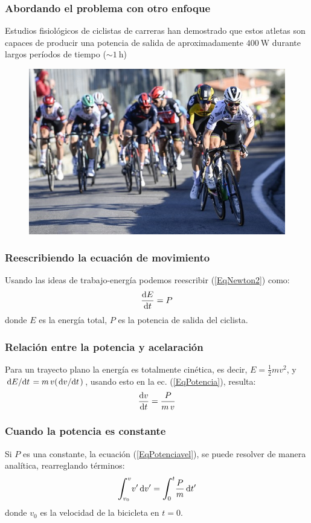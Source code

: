 \documentclass[12pt]{beamer}
\begin{document}
\begin{frame}
\frametitle{Abordando el problema con otro enfoque}
Estudios fisiológicos de ciclistas de carreras han demostrado que estos atletas son capaces de producir una potencia de salida de aproximadamente $\SI{400}{\watt}$ durante largos períodos de tiempo ($\sim \SI{1}{\hour}$)
\begin{figure}
    \centering
    \includegraphics[scale=0.375]{Imagenes/Bicicleta_Tour.jpg}
\end{figure}
\end{frame}
\begin{frame}
\frametitle{Reescribiendo la ecuación de movimiento}
Usando las ideas de trabajo-energía podemos reescribir (\ref{EqNewton2}) como:
\pause
\begin{equation}
\dv{E}{t} = P
\label{EqPotencia}
\end{equation}
donde $E$ es la energía total, $P$ es la potencia de salida del ciclista.
\end{frame}
\begin{frame}
\frametitle{Relación entre la potencia y acelaración}
Para un trayecto plano la energía es totalmente cinética, es decir, $E = \frac{1}{2} m v^{2}$, y $\dv*{E}{t} = m \, v (\dv*{v}{t})$, usando esto en la ec. (\ref{EqPotencia}), resulta:
\pause
\begin{equation}
\dv{v}{t} = \dfrac{P}{m \, v}
\label{EqPotenciavel}
\end{equation}
\end{frame}
\begin{frame}
\frametitle{Cuando la potencia es constante}
Si $P$ es una constante, la ecuación (\ref{EqPotenciavel}), se puede resolver de manera analítica, rearreglando términos:
\pause
\begin{equation}
\scaleint{6ex}_{\bs v_{0}}^{v} v^{\prime} \dd{v^{\prime}} = \scaleint{6ex}_{\bs 0}^{t} \dfrac{P}{m} \dd{t^{\prime}}
\label{EqIntegral}
\end{equation}
donde $v_{0}$ es la velocidad de la bicicleta en $t = 0$.
\end{frame}
\end{document}
